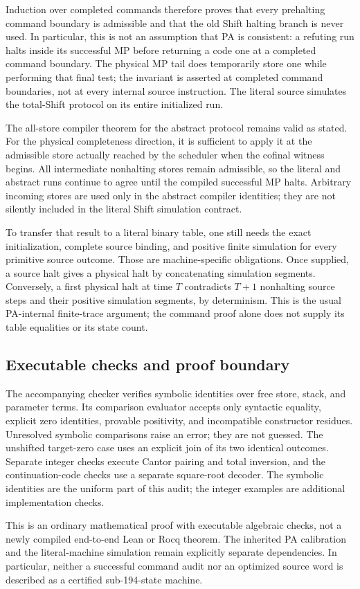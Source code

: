Induction over completed commands therefore proves that every prehalting
command boundary is admissible and that the old Shift halting branch
is never used. In particular, this is not an assumption that PA is
consistent: a refuting run halts inside its successful MP before returning
a code one at a completed command boundary. The physical MP tail does
temporarily store one while performing that final test; the invariant is
asserted at completed command boundaries, not at every internal source
instruction. The literal source simulates the total-Shift protocol on its
entire initialized run.

The all-store compiler theorem for the abstract protocol remains valid
as stated. For the physical completeness direction, it is sufficient to
apply it at the admissible store actually reached by the scheduler when
the cofinal witness begins. All intermediate nonhalting stores remain
admissible, so the literal and abstract runs continue to agree until the
compiled successful MP halts. Arbitrary incoming stores are used only
in the abstract compiler identities; they are not silently included in
the literal Shift simulation contract.

To transfer that result to a literal binary table, one still needs the
exact initialization, complete source binding, and positive finite
simulation for every primitive source outcome. Those are machine-specific
obligations. Once supplied, a source halt gives a physical halt by
concatenating simulation segments. Conversely, a first physical halt at
time $T$ contradicts $T+1$ nonhalting source steps and their positive
simulation segments, by determinism. This is the usual PA-internal
finite-trace argument; the command proof alone does not supply its table
equalities or its state count.

\subsection{Executable checks and proof boundary}

The accompanying checker verifies symbolic identities over free store,
stack, and parameter terms. Its comparison evaluator accepts only
syntactic equality, explicit zero identities, provable positivity, and
incompatible constructor residues. Unresolved symbolic comparisons raise
an error; they are not guessed. The unshifted target-zero case uses an
explicit join of its two identical outcomes. Separate integer checks
execute Cantor pairing and total inversion, and the continuation-code
checks use a separate square-root decoder. The symbolic identities are
the uniform part of this audit; the integer examples are additional
implementation checks.

This is an ordinary mathematical proof with executable algebraic checks,
not a newly compiled end-to-end Lean or Rocq theorem. The inherited PA
calibration and the literal-machine simulation remain explicitly separate
dependencies. In particular, neither a successful command audit nor an
optimized source word is described as a certified sub-194-state machine.
